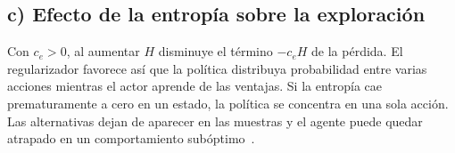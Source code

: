 \subsection*{c) Efecto de la entropía sobre la exploración}

Con $c_e>0$, al aumentar $H$ disminuye el término $-c_e H$ de la pérdida. El regularizador favorece así que la política distribuya probabilidad entre varias acciones mientras el actor aprende de las ventajas. Si la entropía cae prematuramente a cero en un estado, la política se concentra en una sola acción. Las alternativas dejan de aparecer en las muestras y el agente puede quedar atrapado en un comportamiento subóptimo~\cite[secc.~4]{mnih2016}.

